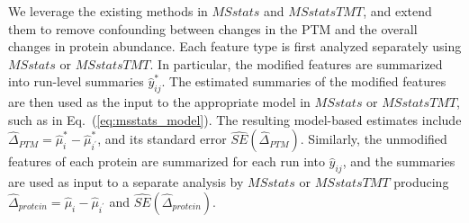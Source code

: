 \documentclass[mcp]{article}
\numberwithin{table}{section}
\def\eqref#1{Eq.~(\ref{eq:#1})}
\begin{document}
We leverage the existing methods in $MSstats$ and $MSstatsTMT$, and extend them to remove confounding between changes in the PTM and the overall changes in protein abundance.  Each feature type is first analyzed separately using $MSstats$ or $MSstatsTMT$. In particular, the modified features are summarized into run-level summaries $\hat{y}_{ij}^{\ast}$. The estimated summaries of the modified features are then used as the input to the appropriate model in $MSstats$ or $MSstatsTMT$,  such as in \eqref{msstats_model}. The resulting model-based estimates include $\hat{\Delta}_{PTM}=\hat{\mu}^{\ast}_{i}-\hat{\mu}_{i^{\prime}}^{\ast}$, and its standard error $\widehat{SE}(\hat{\Delta}_{PTM})$. Similarly, the unmodified features of each protein are summarized for each run into $\hat{y}_{ij}$, and the summaries are used as input to a separate analysis by $MSstats$ or $MSstatsTMT$ producing $\hat{\Delta}_{protein}=\hat{\mu}_{i}-\hat{\mu}_{i^{\prime}}$ and $\widehat{SE}(\hat{\Delta}_{protein})$. 
\end{document}
